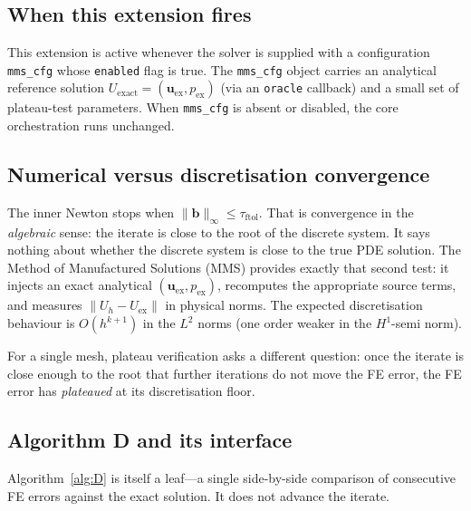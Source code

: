 \documentclass{article}
\newcommand{\code}[1]{\texttt{\small #1}}
\newcommand{\textftol}{\tau_{\mathrm{ftol}}}
\newcommand{\extline}[1]{{\color{extcolor}#1}}
\begin{document}
\subsection{When this extension fires}

This extension is active whenever the solver is supplied with a
configuration \code{mms\_cfg} whose \code{enabled} flag is true. The
\code{mms\_cfg} object carries an analytical reference solution
$U_{\mathrm{exact}} = (\boldsymbol{u}_{\mathrm{ex}}, p_{\mathrm{ex}})$
(via an \code{oracle} callback) and a small set of plateau-test
parameters. When \code{mms\_cfg} is absent or disabled, the core
orchestration runs unchanged.

\subsection{Numerical versus discretisation convergence}

The inner Newton stops when $\|\boldsymbol{b}\|_\infty \le \textftol$.
That is convergence in the \emph{algebraic} sense: the iterate is
close to the root of the discrete system. It says nothing about
whether the discrete system is close to the true PDE solution. The
Method of Manufactured Solutions (MMS) provides exactly that second
test: it injects an exact analytical
$(\boldsymbol{u}_{\mathrm{ex}}, p_{\mathrm{ex}})$, recomputes the
appropriate source terms, and measures $\|U_h - U_{\mathrm{ex}}\|$ in
physical norms. The expected discretisation behaviour is $O(h^{k+1})$
in the $L^2$ norms (one order weaker in the $H^1$-semi norm).

For a single mesh, plateau verification asks a different question:
once the iterate is close enough to the root that further iterations
do not move the FE error, the FE error has \emph{plateaued} at its
discretisation floor.

\subsection{Algorithm D and its interface}

\extline{Algorithm~\ref{alg:D} is itself a leaf---a single side-by-side
comparison of consecutive FE errors against the exact solution. It
does not advance the iterate.}
\end{document}
